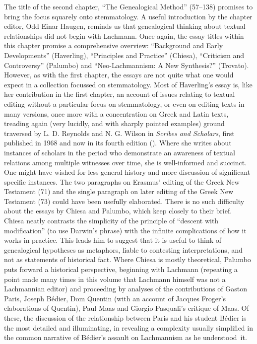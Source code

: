 \begin{review}
The title of the second chapter, ``The Genealogical Method''
(57--138) promises to bring the focus squarely onto stemmatology. A
useful introduction by the chapter editor, Odd Einar Haugen, reminds us
that genealogical thinking about textual relationships did not begin
with Lachmann. Once again, the essay titles within this chapter promise
a comprehensive overview: ``Background and Early Developments''
(Haverling), ``Principles and Practice'' (Chiesa), ``Criticism and
Controversy'' (Palumbo) and ``Neo-Lachmannism: A New Synthesis?''
(Trovato). However, as with the first chapter, the essays are not quite
what one would expect in a collection focussed on stemmatology. Most of
Haverling's essay is, like her contribution in the first chapter, an
account of issues relating to textual editing without a particular focus
on stemmatology, or even on editing texts in many versions, once more
with a concentration on Greek and Latin texts, treading again (very
lucidly, and with sharply pointed examples) ground traversed by L. D.
Reynolds and N. G. Wilson in \emph{Scribes and Scholars}, first
published in 1968 and now in its fourth edition (\citeyear{reynolds_scribes_2013}). Where she writes
about instances of scholars in the period who demonstrate an awareness
of textual relations among multiple witnesses over time, she is
well-informed and succinct. One might have wished for less general
history and more discussion of significant specific instances. The two
paragraphs on Erasmus' editing of the Greek New Testament (71) and the
single paragraph on later editing of the Greek New Testament (73) could
have been usefully elaborated. There is no such difficulty about the
essays by Chiesa and Palumbo, which keep closely to their brief. Chiesa
neatly contrasts the simplicity of the principle of ``descent with
modification'' (to use Darwin's phrase) with the infinite complications
of how it works in practice. This leads him to suggest that it is useful
to think of genealogical hypotheses as metaphors, liable to contesting
interpretations, and not as statements of historical fact. Where Chiesa
is mostly theoretical, Palumbo puts forward a historical perspective,
beginning with Lachmann (repeating a point made many times in this
volume that Lachmann himself was not a Lachmannian editor) and
proceeding by analyses of the contributions of Gaston Paris, Joseph
Bédier, Dom Quentin (with an account of Jacques Froger's elaborations of
Quentin), Paul Maas and Giorgio Pasquali's critique of Maas. Of these,
the discussion of the relationship between Paris and his student Bédier
is the most detailed and illuminating, in revealing a complexity usually
simplified in the common narrative of Bédier's assault on Lachmannism as
he \mbox{understood it}.


\end{review}
